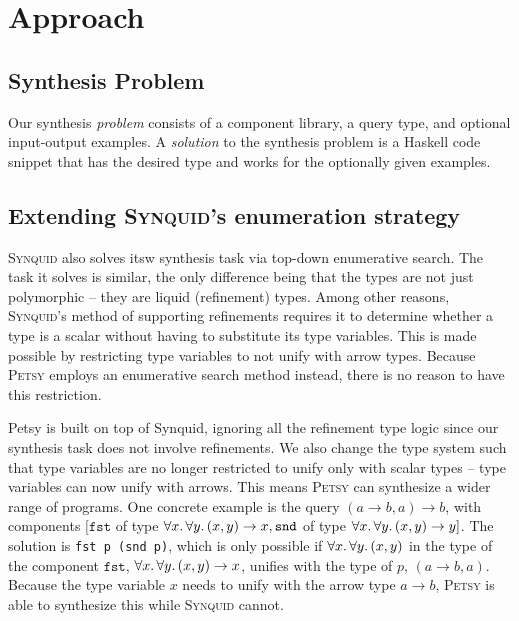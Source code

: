 \documentclass[acmsmall,nonacm]{acmart}
\begin{document}
\section{Approach}
\label{approach}



\subsection{Synthesis Problem}

Our synthesis \textit{problem} consists of a component library, a query type,
and optional input-output examples. A \textit{solution} to the synthesis 
problem is a Haskell code snippet that has the desired type and works 
for the optionally given examples.

\subsection{Extending \textsc{Synquid}'s enumeration strategy} 


\textsc{Synquid} also solves itsw synthesis task via top-down enumerative search.
The task it solves is similar, the only difference being that the types are
not just polymorphic -- they are liquid (refinement) types. Among other
reasons, \textsc{Synquid}'s method of supporting refinements requires it to
determine whether a type is a scalar without having to substitute its type
variables. This is made possible by restricting type variables to not unify
with arrow types. Because \textsc{Petsy} employs an enumerative search method
instead, there is no reason to have this restriction.

Petsy is built on top of Synquid, ignoring all the refinement type logic since
our synthesis task does not involve refinements. We also change the type system
such that type variables are no longer restricted to unify only with scalar types
-- type variables can now unify with arrows.
This means \textsc{Petsy} can synthesize a wider range of programs. One
concrete example is the query $(a \to b, a) \to b$, with components
$[\texttt{fst}$ of type $\forall x\ldotp\forall y\ldotp (x,y)\to x, \texttt{snd}$
of type $\forall x\ldotp\forall y\ldotp (x,y)\to y]$. The solution is \texttt{fst p
(snd p)}, which is only possible if $\forall x\ldotp\forall y\ldotp (x,y)$ in
the type of the component $\texttt{fst}$, $\forall x\ldotp\forall y\ldotp (x,y)\to x$,
unifies with the type of $p$, $(a \to b, a)$. Because the type variable $x$ needs to unify
with the arrow type $a \to b$, \textsc{Petsy} is able to synthesize this
while \textsc{Synquid} cannot.
\end{document}

